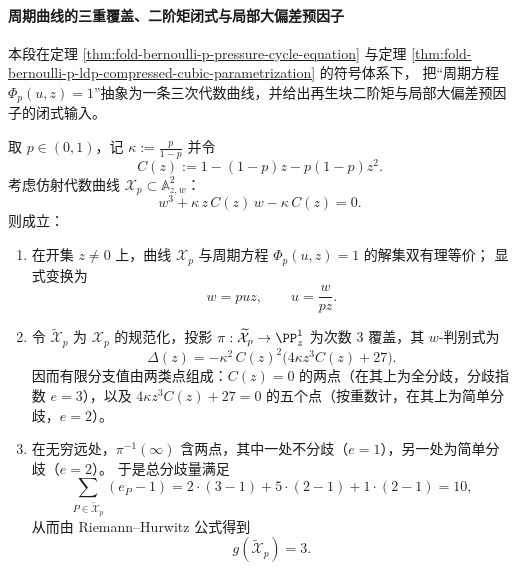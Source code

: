 \paragraph{周期曲线的三重覆盖、二阶矩闭式与局部大偏差预因子}
本段在定理 \ref{thm:fold-bernoulli-p-pressure-cycle-equation} 与定理 \ref{thm:fold-bernoulli-p-ldp-compressed-cubic-parametrization} 的符号体系下，
把“周期方程 \(\Phi_p(u,z)=1\)”抽象为一条三次代数曲线，并给出再生块二阶矩与局部大偏差预因子的闭式输入。

\begin{proposition}[压力周期曲线的三重覆盖模型与分支除子]\label{prop:fold-bernoulli-p-pressure-cycle-trigonal-curve-branch}
取 \(p\in(0,1)\)，记 \(\kappa:=\frac{p}{1-p}\) 并令
\[
C(z):=1-(1-p)z-p(1-p)z^{2}.
\]
考虑仿射代数曲线 \(\mathcal X_p\subset \mathbb A^2_{z,w}\)：
\begin{equation}\label{eq:fold-bernoulli-p-pressure-cycle-trigonal-curve}
w^{3}+\kappa\,z\,C(z)\,w-\kappa\,C(z)=0.
\end{equation}
则成立：
\begin{enumerate}
  \item 在开集 \(z\neq 0\) 上，曲线 \(\mathcal X_p\) 与周期方程 \(\Phi_p(u,z)=1\) 的解集双有理等价；
  显式变换为
  \[
  w=puz,\qquad u=\frac{w}{pz}.
  \]
  \item 令 \(\widetilde{\mathcal X}_p\) 为 \(\mathcal X_p\) 的规范化，投影
  \(
  \pi:\widetilde{\mathcal X}_p\to\PP^1_z
  \)
  为次数 \(3\) 覆盖，其 \(w\)-判别式为
  \begin{equation}\label{eq:fold-bernoulli-p-pressure-cycle-trigonal-discriminant}
  \Delta(z)=-\kappa^{2}\,C(z)^{2}\bigl(4\kappa z^{3}C(z)+27\bigr).
  \end{equation}
  因而有限分支值由两类点组成：\(C(z)=0\) 的两点（在其上为全分歧，分歧指数 \(e=3\)），以及
  \(4\kappa z^{3}C(z)+27=0\) 的五个点（按重数计，在其上为简单分歧，\(e=2\)）。
  \item 在无穷远处，\(\pi^{-1}(\infty)\) 含两点，其中一处不分歧（\(e=1\)），另一处为简单分歧（\(e=2\)）。
  于是总分歧量满足
  \[
  \sum_{P\in\widetilde{\mathcal X}_p}(e_P-1)=2\cdot(3-1)+5\cdot(2-1)+1\cdot(2-1)=10,
  \]
  从而由 Riemann--Hurwitz 公式得到
  \begin{equation}\label{eq:fold-bernoulli-p-pressure-cycle-trigonal-genus}
  g(\widetilde{\mathcal X}_p)=3.
  \end{equation}
\end{enumerate}
\end{proposition}

